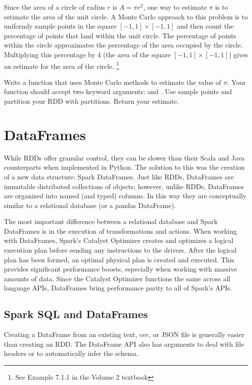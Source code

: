 \begin{problem}
Since the area of a circle of radius $r$ is $A=\pi r^2$, one way to estimate $\pi$ is to estimate the area of the unit circle. 
A Monte Carlo approach to this problem is to uniformly sample points in the square $[-1,1]\times [-1,1]$ and then count the percentage of points that land within the unit circle. 
The percentage of points within the circle approximates the percentage of the area occupied by the circle. Multiplying this percentage by 4 (the area of the square $[-1,1]\times [-1,1]$) gives an estimate for the area of the circle.
\footnote{See Example 7.1.1 in the Volume 2 textbook}

Write a function that uses Monte Carlo methods to estimate the value of $\pi$. 
Your function should accept two keyword arguments:  and . 
Use  sample points and partition your RDD with  partitions. Return your estimate.
\label{prob:spark-monte-carlo-simulation}
\end{problem}

\section*{DataFrames} %
While RDDs offer granular control, they can be slower than their Scala and Java counterparts when implemented in Python.
The solution to this was the creation of a new data structure: Spark DataFrames.
Just like RDDs, DataFrames are immutable distributed collections of objects; however, unlike RDDs, DataFrames are organized into named (and typed) columns. In this way they are conceptually similar to a relational database (or a pandas DataFrame).

The most important difference between a relational database and Spark DataFrames is in the execution of transformations and actions.
When working with DataFrames, Spark's Catalyst Optimizer creates and optimizes a logical execution plan before sending any instructions to the drivers.
After the logical plan has been formed, an optimal physical plan is created and executed.
This provides significant performance boosts, especially when working with massive amounts of data.
Since the Catalyst Optimizer functions the same across all language APIs, DataFrames bring performance parity to all of Spark's APIs.

\subsection*{Spark SQL and DataFrames}
Creating a DataFrame from an existing text, csv, or JSON file is generally easier than creating an RDD.
The DataFrame API also has arguments to deal with file headers or to automatically infer the schema.

